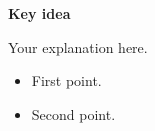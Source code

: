 \begin{PremiumCard}
{\bfseries Key idea}\par
\vspace{0.14cm}
\small
Your explanation here.

\begin{itemize}\scriptsize
  \item First point.
  \item Second point.
\end{itemize}
\end{PremiumCard}
